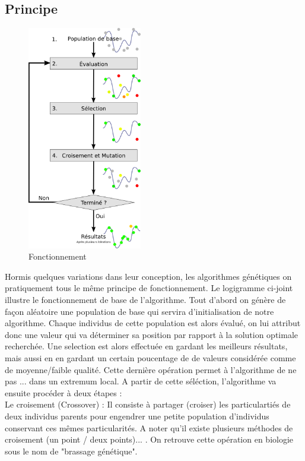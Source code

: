 \documentclass[12pt]{report}
\begin{document}
      \subsection{Principe}
        \begin{figure}
          \centering
          \includegraphics[width=5cm]{img/schema_algo_single.png}
          \caption{Fonctionnement}
        \end{figure}
        Hormis quelques variations dans leur conception, les algorithmes génétiques on pratiquement tous le même principe de fonctionnement.
        Le logigramme ci-joint illustre le fonctionnement de base de l'algorithme.
        Tout d'abord on génère de façon aléatoire une population de base qui servira d'initialisation de notre algorithme.
        Chaque individus de cette population est alors évalué, on lui attribut donc une valeur qui va déterminer sa position par rapport à la solution optimale recherchée.
        Une selection est alors effectuée en gardant les meilleurs résultats, mais aussi en en gardant un certain poucentage de de valeurs considérée comme de moyenne/faible qualité. Cette dernière opération permet à l'algorithme de ne pas ... dans un extremum local.
        A partir de cette séléction, l'algorithme va ensuite procéder à deux étapes : \\
        Le croisement (Crossover) :
        Il consiste à partager (croiser) les particulartiés de deux individus parents pour engendrer une petite population d'individus conservant ces mêmes particularités. A noter qu'il existe plusieurs méthodes de croisement (un point / deux points)... .
        On retrouve cette opération en biologie sous le nom de "brassage génétique".
\end{document}
